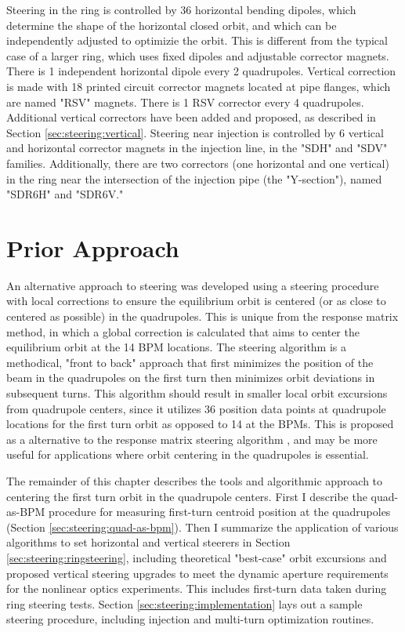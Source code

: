 Steering in the ring is controlled by 36 horizontal bending dipoles, which determine the shape of the horizontal closed orbit, and which can be independently adjusted to optimizie the orbit. This is different from the typical case of a larger ring, which uses fixed dipoles and adjustable corrector magnets. There is 1 independent horizontal dipole every 2 quadrupoles.  Vertical correction is made with 18 printed circuit corrector magnets located at pipe flanges, which are named "RSV" magnets. There is 1 RSV corrector every 4 quadrupoles. Additional vertical correctors have been added and proposed, as described in Section \ref{sec:steering:vertical}. Steering near injection is controlled by 6 vertical and horizontal corrector magnets in the injection line, in the "SDH" and "SDV" families. Additionally, there are two correctors (one horizontal and one vertical) in the ring near the intersection of the injection pipe (the "Y-section"), named "SDR6H" and "SDR6V." 






\section{Prior Approach}




An alternative approach to steering was developed using a steering procedure with local corrections to ensure the equilibrium orbit is centered (or as close to centered as possible) in the quadrupoles. This is unique from the response matrix method, in which a global correction is calculated that aims to center the equilibrium orbit at the 14 BPM locations. The steering algorithm is a methodical, "front to back" approach that first minimizes the position of the beam in the quadrupoles on the first turn then minimizes orbit deviations in subsequent turns. This algorithm should result in smaller local orbit excursions from quadrupole centers, since it utilizes 36 position data points at quadrupole locations for the first turn orbit as opposed to 14 at the BPMs.
This is proposed as a alternative to the response matrix steering algorithm \cite{KPRnote:2011}, and may be more useful for applications where orbit 
centering in the quadrupoles is essential.

The remainder of this chapter describes the tools and algorithmic approach to centering the first turn orbit in the quadrupole centers. First I describe the quad-as-BPM procedure for measuring first-turn centroid position at the quadrupoles (Section \ref{sec:steering:quad-as-bpm}). Then I summarize the application of various algorithms to set horizontal and vertical steerers in Section \ref{sec:steering:ringsteering}, including theoretical "best-case" orbit excursions and proposed vertical steering upgrades to meet the dynamic aperture requirements for the nonlinear optics experiments. This includes first-turn data taken during ring steering tests.
Section \ref{sec:steering:implementation} lays out a sample steering procedure, including injection and multi-turn optimization routines. 



